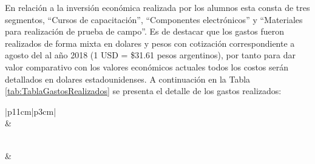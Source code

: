 \begin{itemize}
        \par En relación a la inversión económica realizada por los alumnos esta consta de tres segmentos, ``Cursos de capacitación'', ``Componentes electrónicos'' y ``Materiales para realización de prueba de campo''. Es de destacar que los gastos fueron realizados de forma mixta en dolares y pesos con cotización correspondiente a agosto del al año 2018 (1 USD = \$31.61 pesos argentinos), por tanto para dar valor comparativo con los valores económicos actuales todos los costos serán detallados en dolares estadounidenses. A continuación en la Tabla \ref{tab:TablaGastosRealizados} se presenta el detalle de los gastos realizados:
        \begin{longtable}{|p{11cm}|p{3cm}|}
                \hline
                \\
                \hline
                 &\\
                \hline
                \hline
            \endfirsthead
         
                \hline
                \\
                \hline
                 &\\
                \hline
            \endhead
         

\end{longtable}
\end{itemize}
